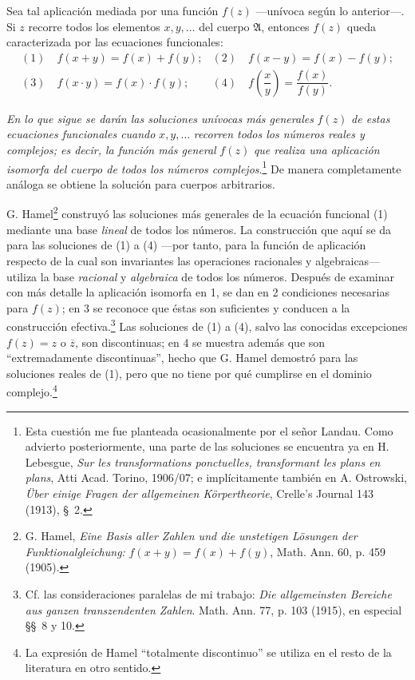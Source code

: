 \documentclass[11pt]{article}
\begin{document}
Sea tal aplicación mediada por una función $f(z)$ ---unívoca según lo anterior---. Si $z$ recorre todos los elementos $x,y,\ldots$ del cuerpo $\mathfrak A$, entonces $f(z)$ queda caracterizada por las ecuaciones funcionales:
\[
\begin{array}{ll}
(1)\quad f(x+y)=f(x)+f(y); & (2)\quad f(x-y)=f(x)-f(y);\\[0.45em]
(3)\quad f(x\cdot y)=f(x)\cdot f(y); & (4)\quad f\!\left(\dfrac{x}{y}\right)=\dfrac{f(x)}{f(y)}.
\end{array}
\]

\emph{En lo que sigue se darán las soluciones unívocas más generales} $f(z)$ \emph{de estas ecuaciones funcionales cuando} $x,y,\ldots$ \emph{recorren todos los números reales y complejos; es decir, la función más general} $f(z)$ \emph{que realiza una aplicación isomorfa del cuerpo de todos los números complejos}.\footnote{Esta cuestión me fue planteada ocasionalmente por el señor Landau. Como advierto posteriormente, una parte de las soluciones se encuentra ya en H. Lebesgue, \emph{Sur les transformations ponctuelles, transformant les plans en plans}, Atti Acad. Torino, 1906/07; e implícitamente también en A. Ostrowski, \emph{Über einige Fragen der allgemeinen Körpertheorie}, Crelle's Journal 143 (1913), \S\ 2.} De manera completamente análoga se obtiene la solución para cuerpos arbitrarios.

G. Hamel\footnote{G. Hamel, \emph{Eine Basis aller Zahlen und die unstetigen Lösungen der Funktionalgleichung:} $f(x+y)=f(x)+f(y)$, Math. Ann. 60, p. 459 (1905).} construyó las soluciones más generales de la ecuación funcional (1) mediante una base \emph{lineal} de todos los números. La construcción que aquí se da para las soluciones de (1) a (4) ---por tanto, para la función de aplicación respecto de la cual son invariantes las operaciones racionales y algebraicas--- utiliza la base \emph{racional} y \emph{algebraica} de todos los números. Después de examinar con más detalle la aplicación isomorfa en 1, se dan en 2 condiciones necesarias para $f(z)$; en 3 se reconoce que éstas son suficientes y conducen a la construcción efectiva.\footnote{Cf. las consideraciones paralelas de mi trabajo: \emph{Die allgemeinsten Bereiche aus ganzen transzendenten Zahlen}. Math. Ann. 77, p. 103 (1915), en especial \S\S\ 8 y 10.} Las soluciones de (1) a (4), salvo las conocidas excepciones $f(z)=z$ o $\overline z$, son discontinuas; en 4 se muestra además que son ``extremadamente discontinuas'', hecho que G. Hamel demostró para las soluciones reales de (1), pero que no tiene por qué cumplirse en el dominio complejo.\footnote{La expresión de Hamel ``totalmente discontinuo'' se utiliza en el resto de la literatura en otro sentido.}
\end{document}
